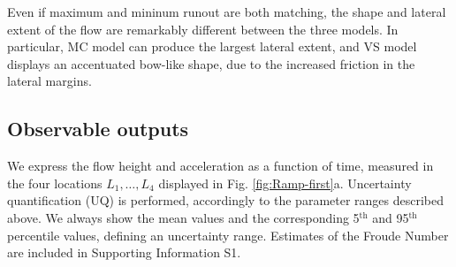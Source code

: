 \documentclass{article}
\begin{document}

Even if maximum and mininum runout are both matching, the shape and lateral extent of the flow are remarkably different between the three models. In particular, MC model can produce the largest lateral extent, and VS model displays an accentuated bow-like shape, due to the increased friction in the lateral margins.

\subsection{Observable outputs} \label{Obs1}
We express the flow height and acceleration as a function of time, measured in the four locations $L_1,\dots, L_4$ displayed in Fig. \ref{fig:Ramp-first}a. Uncertainty quantification (UQ) is performed, accordingly to the parameter ranges described above. We always show the mean values and the corresponding 5$^{\mathrm{th}}$ and 95$^{\mathrm{th}}$ percentile values, defining an uncertainty range. Estimates of the Froude Number are included in Supporting Information S1.
\end{document}
